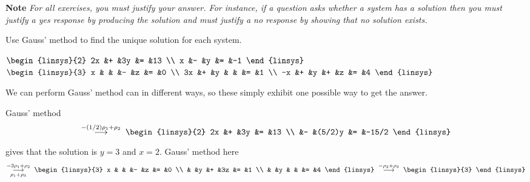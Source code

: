 \medskip
\noindent\textbf{Note}\hspace*{.2em}
\textit{For all exercises,
you must justify your answer.
For instance, if a question asks whether a system has a solution then you
must justify a yes response by producing the solution and must justify 
a no response by showing that no solution exists.}
\begin{exercises}
  \recommended \item 
    Use Gauss' method to find the unique solution for each system.
    \begin{exparts*}
      \partsitem 
        $\begin{linsys}{2}
          2x  &+  &3y  &=  &13  \\
          x   &-  &y   &=  &-1
        \end{linsys}$
      \partsitem 
        $\begin{linsys}{3}
          x   &  &  &-  &z  &=  &0  \\
          3x  &+ &y &   &   &=  &1  \\
          -x  &+ &y &+  &z  &=  &4
        \end{linsys}$
    \end{exparts*}
    \begin{answer}
      We can perform Gauss' method can in different ways, so these simply 
      exhibit one possible way to get the answer.
      \begin{exparts}
        \partsitem Gauss' method
          \begin{equation*}
            \grstep{-(1/2)\rho_1+\rho_2}\;
            \begin{linsys}{2}
               2x  &+  &3y      &=  &13  \\
                   &-  &(5/2)y  &=  &-15/2              
            \end{linsys}
          \end{equation*}
          gives that the solution is $y=3$ and $x=2$.
        \partsitem Gauss' method here
          \begin{equation*}
            \grstep[\rho_1+\rho_3]{-3\rho_1+\rho_2}\;
            \begin{linsys}{3}
              x   &  &  &-  &z  &=  &0  \\
                  &  &y &+  &3z &=  &1  \\
                  &  &y &   &   &=  &4
            \end{linsys}
            \;\grstep{-\rho_2+\rho_3}\;
            \begin{linsys}{3}

\end{linsys}
\end{equation*}
\end{exparts}
\end{answer}
\end{exercises}
